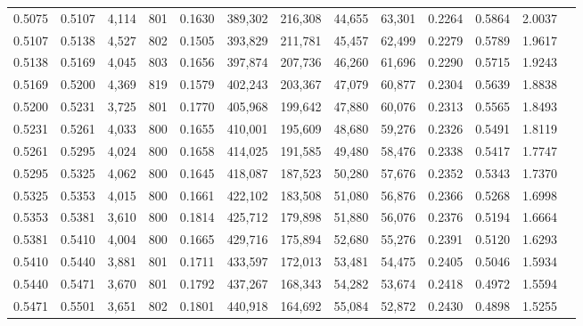 \begin{tabular}{rrrrrrrrrrrrr}
0.5075 & 0.5107 &  4,114 & 801 &                                     0.1630 & 389,302 & 216,308 &  44,655 &  63,301 & 0.2264 & 0.5864 & 2.0037 \\
0.5107 & 0.5138 &  4,527 & 802 &                                     0.1505 & 393,829 & 211,781 &  45,457 &  62,499 & 0.2279 & 0.5789 & 1.9617 \\
0.5138 & 0.5169 &  4,045 & 803 &                                     0.1656 & 397,874 & 207,736 &  46,260 &  61,696 & 0.2290 & 0.5715 & 1.9243 \\
0.5169 & 0.5200 &  4,369 & 819 &                                     0.1579 & 402,243 & 203,367 &  47,079 &  60,877 & 0.2304 & 0.5639 & 1.8838 \\
0.5200 & 0.5231 &  3,725 & 801 &                                     0.1770 & 405,968 & 199,642 &  47,880 &  60,076 & 0.2313 & 0.5565 & 1.8493 \\
0.5231 & 0.5261 &  4,033 & 800 &                                     0.1655 & 410,001 & 195,609 &  48,680 &  59,276 & 0.2326 & 0.5491 & 1.8119 \\
0.5261 & 0.5295 &  4,024 & 800 &                                     0.1658 & 414,025 & 191,585 &  49,480 &  58,476 & 0.2338 & 0.5417 & 1.7747 \\
0.5295 & 0.5325 &  4,062 & 800 &                                     0.1645 & 418,087 & 187,523 &  50,280 &  57,676 & 0.2352 & 0.5343 & 1.7370 \\
0.5325 & 0.5353 &  4,015 & 800 &                                     0.1661 & 422,102 & 183,508 &  51,080 &  56,876 & 0.2366 & 0.5268 & 1.6998 \\
0.5353 & 0.5381 &  3,610 & 800 &                                     0.1814 & 425,712 & 179,898 &  51,880 &  56,076 & 0.2376 & 0.5194 & 1.6664 \\
0.5381 & 0.5410 &  4,004 & 800 &                                     0.1665 & 429,716 & 175,894 &  52,680 &  55,276 & 0.2391 & 0.5120 & 1.6293 \\
0.5410 & 0.5440 &  3,881 & 801 &                                     0.1711 & 433,597 & 172,013 &  53,481 &  54,475 & 0.2405 & 0.5046 & 1.5934 \\
0.5440 & 0.5471 &  3,670 & 801 &                                     0.1792 & 437,267 & 168,343 &  54,282 &  53,674 & 0.2418 & 0.4972 & 1.5594 \\
0.5471 & 0.5501 &  3,651 & 802 &                                     0.1801 & 440,918 & 164,692 &  55,084 &  52,872 & 0.2430 & 0.4898 & 1.5255 \\

\end{tabular}
